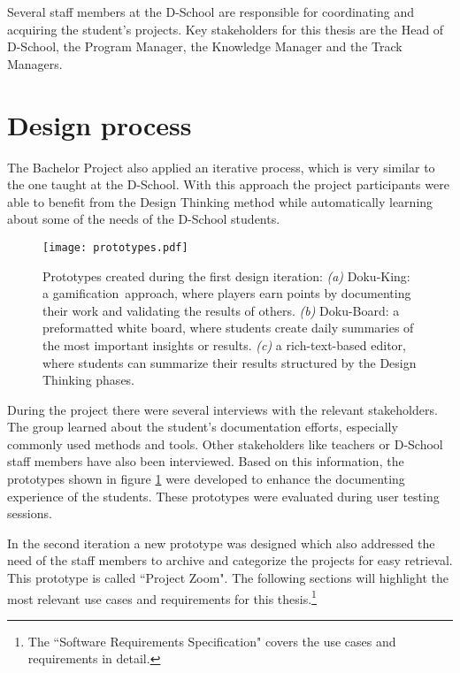 Several staff members at the D-School are responsible for coordinating and acquiring the student's pro\-jects. Key stakeholders for this thesis are the Head of D-School, the Program Manager, the Knowledge Manager and the Track Managers.

\section{Design process}
The Bachelor Project also applied an iterative process, which is very similar to the one taught at the D-School. With this approach the project participants were able to benefit from the Design Thinking method while automatically learning about some of the needs of the D-School students.

\begin{figure}
\texttt{[image: prototypes.pdf]}
\caption[Prototypes created during the first design iteration]{Prototypes created during the first design iteration: \textit{(a)} Doku-King: a gamification\footnotemark ~approach, where players earn points by documenting their work and validating the results of others. \textit{(b)} Doku-Board: a preformatted white board, where students create daily summaries of the most important insights or results. \textit{(c)} a rich-text-based editor, where students can summarize their results structured by the Design Thinking phases.}
\label{fig:First_prototypes}
\end{figure}


During the project there were several interviews with the relevant stakeholders. The group learned about the student's documentation efforts, especially commonly used methods and tools. Other stakeholders like teachers or D-School staff members have also been interviewed. Based on this information, the prototypes shown in figure \ref{fig:First_prototypes} were developed to enhance the documenting experience of the students. These prototypes were evaluated during user testing sessions.

In the second iteration a new prototype was designed which also addressed the need of the staff members to archive and categorize the projects for easy retrieval. This prototype is called ``Project Zoom". The following sections will highlight the most relevant use cases and requirements for this thesis.\footnote{The ``Software Requirements Specification"\cite{ReqSpec} covers the use cases and requirements in detail.}


